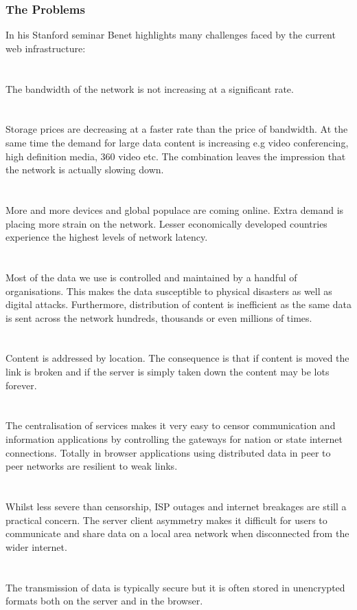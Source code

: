 \subsubsection{The Problems}
In his Stanford seminar Benet highlights many challenges faced by the current web infrastructure:\\
\\
\\
The bandwidth of the network is not increasing at a significant rate. \\
\\
\\
Storage prices are decreasing at a faster rate than the price of bandwidth. At the same time the demand for large data content is increasing e.g video conferencing, high definition media, 360 video etc. The combination leaves the impression that the network is actually slowing down.\\
\\
\\
More and more devices and global populace are coming online. Extra demand is placing more strain on the network. Lesser economically developed countries experience the highest levels of network latency.\\
\\
\\
Most of the data we use is controlled and maintained by a handful of organisations. This makes the data susceptible to physical disasters\cite{DCFire} as well as digital attacks. Furthermore, distribution of content is inefficient as the same data is sent across the network hundreds, thousands or even millions of times.\\
\\
\\
Content is addressed by location. The consequence is that if content is moved the link is broken and if the server is simply taken down the content may be lots forever.\\
\\
\\
The centralisation of services makes it very easy to censor communication and information applications by controlling the gateways for nation or state internet connections. Totally in browser applications using distributed data in peer to peer networks are resilient to weak links.\\
\\
\\
Whilst less severe than censorship, ISP outages and internet breakages are still a practical concern. The server client asymmetry makes it difficult for users to communicate and share data on a local area network when disconnected from the wider internet. \\
\\
\\
The transmission of data is typically secure but it is often stored in unencrypted formats both on the server and in the browser. \\

